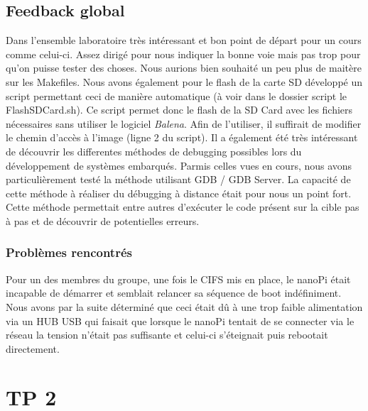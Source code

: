 \documentclass{ReportTemplate}
\begin{document}
\section{Feedback global}
Dans l'ensemble laboratoire très intéressant et bon point de départ pour un
cours comme celui-ci. Assez dirigé pour nous indiquer la bonne voie mais pas
trop pour qu'on puisse tester des choses. Nous aurions bien souhaité un peu plus
de maitère sur les Makefiles.\newline
Nous avons également pour le flash de la carte SD développé un script permettant
ceci de manière automatique (à voir dans le dossier script le FlashSDCard.sh).
Ce script permet donc le flash de la SD Card avec les fichiers nécessaires sans
utiliser le logiciel \textit{Balena}. Afin de l'utiliser, il suffirait de
modifier le chemin d'accès à l'image (ligne 2 du script). Il a également été
très intéressant de découvrir les differentes méthodes de debugging possibles
lors du développement de systèmes embarqués. Parmis celles vues en cours, nous
avons particulièrement testé la méthode utilisant GDB / GDB Server. La capacité
de cette méthode à réaliser du débugging à distance était pour nous un point
fort. Cette méthode permettait entre autres d'exécuter le code présent sur la
cible pas à pas et de découvrir de potentielles erreurs.\newline
\subsection{Problèmes rencontrés}
Pour un des membres du groupe, une fois le CIFS mis en place, le nanoPi était
incapable de démarrer et semblait relancer sa séquence de boot indéfiniment.
Nous avons par la suite déterminé que ceci était dû à une trop faible
alimentation via un HUB USB qui faisait que lorsque le nanoPi tentait de se
connecter via le réseau la tension n'était pas suffisante et celui-ci
s'éteignait puis rebootait directement.

\chapter{TP 2}
\end{document}
